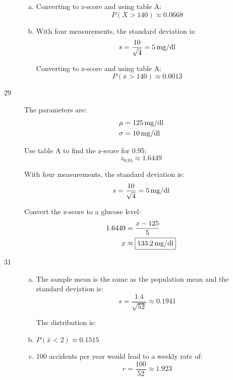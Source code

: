 \documentclass[letterpaper]{exam}
\begin{document}
\begin{description}
        \begin{enumerate}[(a)]
          \item 
            Converting to z-score and using table A:
            \[
              P(X > 140) \approx \boxed{ 0.0668 }
            \]

          \item 
            With four measurements, the standard deviation is:
            \[
              s = \frac{10}{\sqrt{4}} = \unit[5]{mg/dl}
            \]

            Converting to z-score and using table A:
            \[
              P(\bar{x} > 140) \approx \boxed{ 0.0013 }
            \]
        \end{enumerate}

      \item[29]
        The parameters are:
        \begin{align*}
          \mu    & = \unit[125]{mg/dl} \\
          \sigma & = \unit[10]{mg/dl} \\
        \end{align*}

        Use table A to find the z-score for 0.95:
        \[
          z_{0.95} \approx 1.6449
        \]

        With four measurements, the standard deviation is:
        \[
          s = \frac{10}{\sqrt{4}} = \unit[5]{mg/dl}
        \]

        Convert the z-score to a glucose level:
        \begin{align*}
          1.6449 & = \frac{x - 125}{5} \\
          x      & \approx \boxed{ \unit[133.2]{mg/dl} } \\
        \end{align*}

      \item[31]
        \begin{enumerate}[(a)]
          \item The sample mean is the same as the population mean and the
            standard deviation is:
            \[
              s = \frac{1.4}{\sqrt{52}} \approx 0.1941
            \]

            The distribution is: 

          \item $P(\bar{x} < 2) \approx \boxed{ 0.1515 }$

          \item 100 accidents per year would lead to a weekly rate of:
            \[
              r = \frac{100}{52} \approx 1.923
            \]


\end{enumerate}
\end{description}
\end{document}

